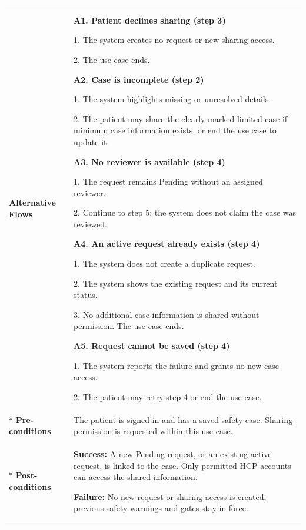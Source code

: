 \begin{longtable}{|p{}|p{}|}
\hline
\textbf{Alternative Flows} &
\textbf{A1. Patient declines sharing (step 3)}\par
1. The system creates no request or new sharing access.\par
2. The use case ends.
\par
\textbf{A2. Case is incomplete (step 2)}\par
1. The system highlights missing or unresolved details.\par
2. The patient may share the clearly marked limited case if minimum case information exists, or end the use case to update it.
\par
\textbf{A3. No reviewer is available (step 4)}\par
1. The request remains Pending without an assigned reviewer.\par
2. Continue to step 5; the system does not claim the case was reviewed.
\par
\textbf{A4. An active request already
exists (step 4)}\par
1. The system does not create
a duplicate request.\par
2. The system shows the existing
request and its current status.\par
3. No additional case information
is shared without permission.
The use case ends.
\par
\textbf{A5. Request cannot be saved (step 4)}\par
1. The system reports the failure and grants no new case access.\par
2. The patient may retry step 4 or end the use case.
\\* \hline
\textbf{Pre-conditions} & The patient is signed in and has a saved safety case. Sharing permission is requested within this use case. \\* \hline
\textbf{Post-conditions} & \textbf{Success:} A new Pending request, or an existing active request, is linked to the case. Only permitted HCP accounts can access the shared information.\par
\textbf{Failure:} No new request or sharing access is created; previous safety warnings and gates stay in force. \\ \hline
\end{longtable}


\clearpage
